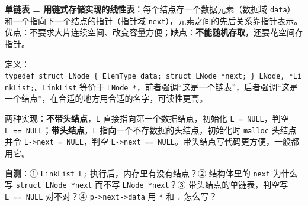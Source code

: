 \documentclass[10.5pt,a4paper,oneside]{article}
\newcommand{\hlred}[1]{\textcolor{wdred}{\bfseries #1}}
\newcommand{\tocback}{\par\vspace{-3pt}{\hfill\footnotesize\hyperlink{toc}{\textcolor{wdgray}{\ensuremath{\uparrow}\,回到目录}}}\par\vspace{-4pt}}
\begin{document}
\tocback

\begin{summarybox}

\textbf{单链表 = 用链式存储实现的线性表}：每个结点存一个数据元素（数据域
\texttt{data}）和一个指向下一个结点的指针（指针域
\texttt{next}），元素之间的先后关系靠指针表示。优点：不要求大片连续空间、改变容量方便；缺点：\hlred{不能随机存取}，还要花空间存指针。

定义：\texttt{typedef\ struct\ LNode\ \{\ ElemType\ data;\ struct\ LNode\ *next;\ \}\ LNode,\ *LinkList;}。\texttt{LinkList}
等价于
\texttt{LNode\ *}，前者强调“这是一个链表”，后者强调“这是一个结点”，在合适的地方用合适的名字，可读性更高。

两种实现：\textbf{不带头结点}，\texttt{L} 直接指向第一个数据结点，初始化
\texttt{L\ =\ NULL}，判空
\texttt{L\ ==\ NULL}；\textbf{带头结点}，\texttt{L}
指向一个不存数据的头结点，初始化时 \texttt{malloc} 头结点并令
\texttt{L-\textgreater{}next\ =\ NULL}，判空
\texttt{L-\textgreater{}next\ ==\ NULL}。带头结点写代码更方便，一般都用它。

\textbf{自测}：① \texttt{LinkList\ L;} 执行后，内存里有没有结点？②
结构体里的 \texttt{next} 为什么写 \texttt{struct\ LNode\ *next} 而不写
\texttt{LNode\ *next}？③ 带头结点的单链表，判空写 \texttt{L\ ==\ NULL}
对不对？④ \texttt{p-\textgreater{}next-\textgreater{}data} 用 \texttt{*}
和 \texttt{.} 怎么写？

\end{summarybox}
\end{document}
